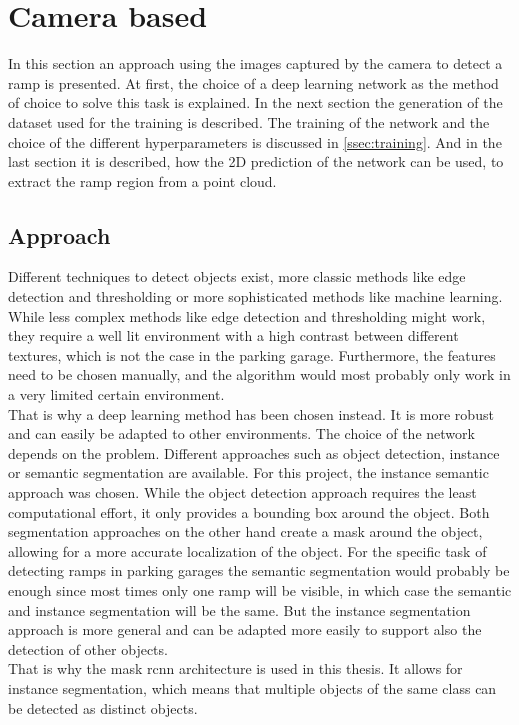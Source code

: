 \section{Camera based}
\label{sec:methods_camera}
In this section an approach using the images captured by the camera to detect a ramp is presented.
At first, the choice of a deep learning network as the method of choice to solve this task is explained.
In the next section the generation of the dataset used for the training is described.
The training of the network and the choice of the different hyperparameters is discussed in \cref{ssec:training}.
And in the last section it is described, how the 2D prediction of the network can be used, to extract the ramp region from a point cloud.

\subsection{Approach}
Different techniques to detect objects exist, more classic methods like edge detection and thresholding or more sophisticated methods like machine learning.
While less complex methods like edge detection and thresholding might work, they require a well lit environment with a high contrast between different textures, which is not the case in the parking garage.
Furthermore, the features need to be chosen manually, and the algorithm would most probably only work in a very limited certain environment.\\
That is why a deep learning method has been chosen instead.
It is more robust and can easily be adapted to other environments.
The choice of the network depends on the problem.
Different approaches such as object detection, instance or semantic segmentation are available.
For this project, the instance semantic approach was chosen.
While the object detection approach requires the least computational effort, it only provides a bounding box around the object.
Both segmentation approaches on the other hand create a mask around the object, allowing for a more accurate localization of the object.
For the specific task of detecting ramps in parking garages the semantic segmentation would probably be enough since most times only one ramp will be visible, in which case the semantic and instance segmentation will be the same.
But the instance segmentation approach is more general and can be adapted more easily to support also the detection of other objects.\\
That is why the mask \gls{rcnn} architecture is used in this thesis.
It allows for instance segmentation, which means that multiple objects of the same class can be detected as distinct objects.
